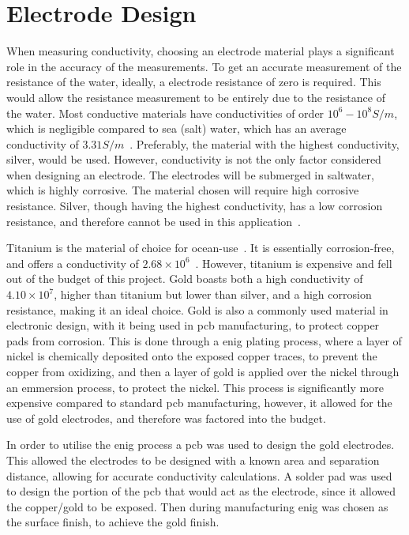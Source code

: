 \section{Electrode Design}\label{sec:electrode_design}
When measuring conductivity, choosing an electrode material plays a significant role in the accuracy of the measurements.
To get an accurate measurement of the resistance of the water, ideally, a electrode resistance of zero is required.
This would allow the resistance measurement to be entirely due to the resistance of the water.
Most conductive materials have conductivities of order $10^6 - 10^8 S/m$, which is negligible compared to sea (salt) water, which has an average conductivity of $3.31 S/m$~\cite{conductivities}\cite{ocean_conductivity_tyler}.
Preferably, the material with the highest conductivity, silver, would be used. However, conductivity is not the only factor considered when designing an electrode. 
The electrodes will be submerged in saltwater, which is highly corrosive. The material chosen will require high corrosive resistance. 
Silver, though having the highest conductivity, has a low corrosion resistance, and therefore cannot be used in this application~\cite{zhang_silver}.

Titanium is the material of choice for ocean-use~\cite{materials_ocean_structures}. It is essentially corrosion-free, and offers a conductivity of $2.68\times 10^{6}$~\cite{conductivities}.
However, titanium is expensive and fell out of the budget of this project.
Gold boasts both a high conductivity of $4.10\times 10^{7}$, higher than titanium but lower than silver, and a high corrosion resistance, making it an ideal choice.
Gold is also a commonly used material in electronic design, with it being used in \gls{pcb} manufacturing, to protect copper pads from corrosion.
This is done through a \gls{enig} plating process, where a layer of nickel is chemically deposited onto the exposed copper traces, to prevent the copper from oxidizing, and then a layer of gold is applied over the nickel through an emmersion process, to protect the nickel.
This process is significantly more expensive compared to standard \gls{pcb} manufacturing, however, it allowed for the use of gold electrodes, and therefore was factored into the budget. 

In order to utilise the \gls{enig} process a \gls{pcb} was used to design the gold electrodes.
This allowed the electrodes to be designed with a known area and separation distance, allowing for accurate conductivity calculations.
A solder pad was used to design the portion of the \gls{pcb} that would act as the electrode, since it allowed the copper/gold to be exposed.
Then during manufacturing \gls{enig} was chosen as the surface finish, to achieve the gold finish.

